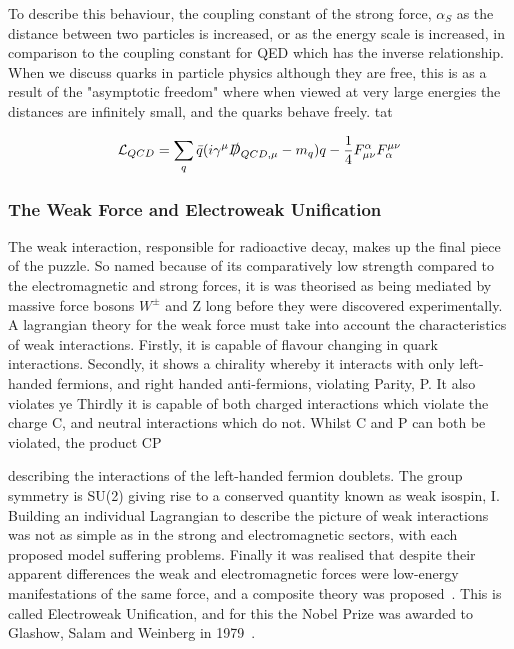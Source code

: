  To describe this behaviour, the coupling constant of the strong force, $\alpha_{S}$  as the distance between two particles is increased, or as the energy scale is increased, in comparison to the coupling constant for QED which has the inverse relationship. When we discuss quarks in particle physics although they are free, this is as a result of the "asymptotic freedom" where when viewed at very large energies the distances are infinitely small, and the quarks behave freely. tat

\begin{equation}
{\mathcal{L}}_{QCD} = \sum_{q} \bar{q}(i \gamma^{\mu}\slashed{D}_{QCD,\mu} - m_{q}) q - \frac{1}{4}F^{\alpha}_{\mu \nu}F^{\mu \nu}_{\alpha}
\label{eqn:QCDL}
\end{equation}



\subsubsection{The Weak Force and Electroweak Unification}

The weak interaction, responsible for radioactive decay, makes up the final piece of the puzzle. So named because of its comparatively low strength compared to the electromagnetic and strong forces, it is was theorised as being mediated by massive force bosons $W^{\pm}$ and Z long before they were discovered experimentally. A lagrangian theory for the weak force must take into account the characteristics of weak interactions. Firstly, it is capable of flavour changing in quark interactions. Secondly, it shows a chirality whereby it interacts with only left-handed fermions, and right handed anti-fermions, violating Parity, P. It also violates ye Thirdly it is capable of both charged interactions which violate the charge C, and neutral interactions which do not. Whilst C and P can both be violated, the product CP 

 describing the interactions of the left-handed fermion doublets. The group symmetry is SU(2) giving rise to a conserved quantity known as weak isospin, I. Building an individual Lagrangian to describe the picture of weak interactions was not as simple as in the strong and electromagnetic sectors, with each proposed model suffering problems. Finally it was realised that despite their apparent differences the weak and electromagnetic forces were low-energy manifestations of the same force, and a composite theory was proposed~\cite{Glashow}. This is called Electroweak Unification, and for this the Nobel Prize was awarded to Glashow, Salam and Weinberg in 1979~\cite{Breaking}. 

